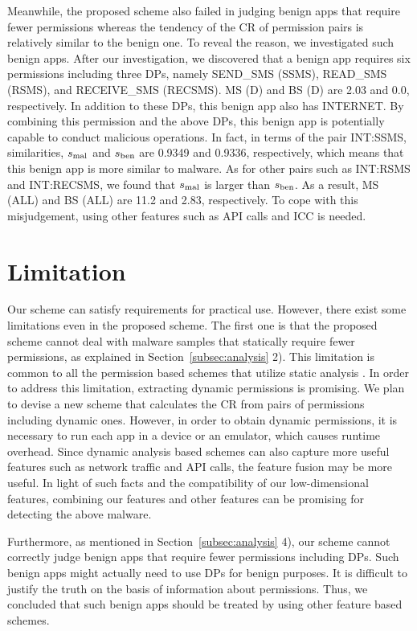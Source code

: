 \documentclass{ieeeaccess}
\begin{document}
Meanwhile, the proposed scheme also failed in judging benign apps that require fewer permissions whereas the tendency of the CR of permission pairs is relatively similar to the benign one.
To reveal the reason, we investigated such benign apps.
After our investigation, we discovered that a benign app requires six permissions including three DPs, namely SEND\_SMS (SSMS), READ\_SMS (RSMS), and RECEIVE\_SMS (RECSMS).
MS (D) and BS (D) are 2.03 and 0.0, respectively.
In addition to these DPs, this benign app also has INTERNET.
By combining this permission and the above DPs, this benign app is potentially capable to conduct malicious operations.
In fact, in terms of the pair INT:SSMS, similarities, $s_{\mathrm{mal}}$ and $s_{\mathrm{ben}}$ are 0.9349 and 0.9336, respectively, which means that this benign app is more similar to malware.
As for other pairs such as INT:RSMS and INT:RECSMS, we found that $s_{\mathrm{mal}}$ is larger than $s_{\mathrm{ben}}$.
As a result, MS (ALL) and BS (ALL) are 11.2 and 2.83, respectively.
To cope with this misjudgement, using other features such as API calls and ICC is needed.

\section{Limitation} \label{sec:limitation}
Our scheme can satisfy requirements for practical use.
However, there exist some limitations even in the proposed scheme.
The first one is that the proposed scheme cannot deal with malware samples that statically require fewer permissions, as explained in Section~\ref{subsec:analysis} 2).
This limitation is common to all the permission based schemes that utilize static analysis \cite{li2018significant, liang2014permission, liu2014two, arora2019permpair}.
In order to address this limitation, extracting dynamic permissions \cite{mahindru2017dynamic} is promising.
We plan to devise a new scheme that calculates the CR from pairs of permissions including dynamic ones.
However, in order to obtain dynamic permissions, it is necessary to run each app in a device or an emulator, which causes runtime overhead.
Since dynamic analysis based schemes can also capture more useful features such as network traffic and API calls, the feature fusion may be more useful.
In light of such facts and the compatibility of our low-dimensional features, combining our features and other features can be promising for detecting the above malware.

Furthermore, as mentioned in Section~\ref{subsec:analysis} 4), our scheme cannot correctly judge benign apps that require fewer permissions including DPs.
Such benign apps might actually need to use DPs for benign purposes.
It is difficult to justify the truth on the basis of information about permissions.
Thus, we concluded that such benign apps should be treated by using other feature based schemes.
\end{document}
